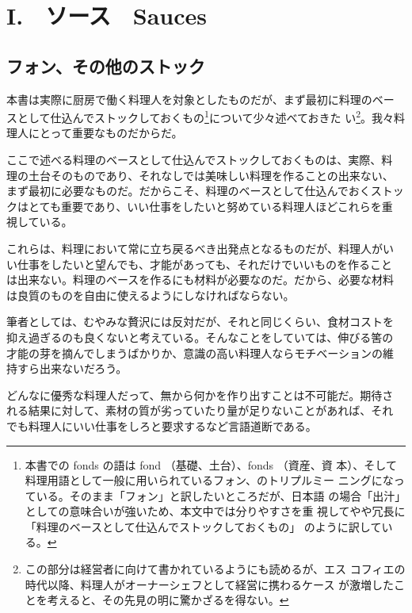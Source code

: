 \hypertarget{sauces}{%
\chapter{I.　ソース　Sauces}\label{sauces}}

\hypertarget{les-fonds-de-cuisine}{%
\section{フォン、その他のストック}\label{les-fonds-de-cuisine}}


 

\normalsize
{}

本書は実際に厨房で働く料理人を対象としたものだが、まず最初に料理のベー
スとして仕込んでストックしておくもの\footnote{本書での fonds の語は fond
  （基礎、土台）、fonds （資産、資
  本）、そして料理用語として一般に用いられているフォン、のトリプルミー
  ニングになっている。そのまま「フォン」と訳したいところだが、日本語
  の場合「出汁」としての意味合いが強いため、本文中では分りやすさを重
  視してやや冗長に「料理のベースとして仕込んでストックしておくもの」
  のように訳している。}について少々述べておきた い\footnote{この部分は経営者に向けて書かれているようにも読めるが、エス
  コフィエの時代以降、料理人がオーナーシェフとして経営に携わるケース
  が激増したことを考えると、その先見の明に驚かざるを得ない。}。我々料理人にとって重要なものだからだ。

ここで述べる料理のベースとして仕込んでストックしておくものは、実際、料
理の土台そのものであり、それなしでは美味しい料理を作ることの出来ない、
まず最初に必要なものだ。だからこそ、料理のベースとして仕込んでおくストッ
クはとても重要であり、いい仕事をしたいと努めている料理人ほどこれらを重
視している。

これらは、料理において常に立ち戻るべき出発点となるものだが、料理人がい
い仕事をしたいと望んでも、才能があっても、それだけでいいものを作ること
は出来ない。料理のベースを作るにも材料が必要なのだ。だから、必要な材料
は良質のものを自由に使えるようにしなければならない。

筆者としては、むやみな贅沢には反対だが、それと同じくらい、食材コストを
抑え過ぎるのも良くないと考えている。そんなことをしていては、伸びる筈の
才能の芽を摘んでしまうばかりか、意識の高い料理人ならモチベーションの維
持すら出来ないだろう。

どんなに優秀な料理人だって、無から何かを作り出すことは不可能だ。期待さ
れる結果に対して、素材の質が劣っていたり量が足りないことがあれば、それ
でも料理人にいい仕事をしろと要求するなど言語道断である。

